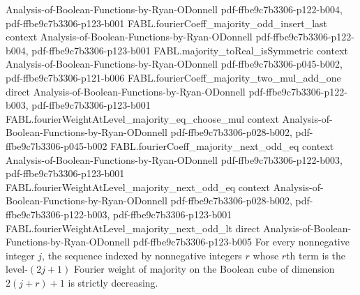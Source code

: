 \begin{theorem}
  {Analysis-of-Boolean-Functions-by-Ryan-ODonnell}
  {pdf-ffbe9c7b3306-p122-b004,
    pdf-ffbe9c7b3306-p123-b001}
\proofstep
  {FABL.fourierCoeff_majority_odd_insert_last}
  {context}
  {Analysis-of-Boolean-Functions-by-Ryan-ODonnell}
  {pdf-ffbe9c7b3306-p122-b004,
    pdf-ffbe9c7b3306-p123-b001}
\proofstep
  {FABL.majority_toReal_isSymmetric}
  {context}
  {Analysis-of-Boolean-Functions-by-Ryan-ODonnell}
  {pdf-ffbe9c7b3306-p045-b002,
    pdf-ffbe9c7b3306-p121-b006}
\proofstep
  {FABL.fourierCoeff_majority_two_mul_add_one}
  {direct}
  {Analysis-of-Boolean-Functions-by-Ryan-ODonnell}
  {pdf-ffbe9c7b3306-p122-b003,
    pdf-ffbe9c7b3306-p123-b001}
\proofstep
  {FABL.fourierWeightAtLevel_majority_eq_choose_mul}
  {context}
  {Analysis-of-Boolean-Functions-by-Ryan-ODonnell}
  {pdf-ffbe9c7b3306-p028-b002,
    pdf-ffbe9c7b3306-p045-b002}
\proofstep
  {FABL.fourierCoeff_majority_next_odd_eq}
  {context}
  {Analysis-of-Boolean-Functions-by-Ryan-ODonnell}
  {pdf-ffbe9c7b3306-p122-b003,
    pdf-ffbe9c7b3306-p123-b001}
\proofstep
  {FABL.fourierWeightAtLevel_majority_next_odd_eq}
  {context}
  {Analysis-of-Boolean-Functions-by-Ryan-ODonnell}
  {pdf-ffbe9c7b3306-p028-b002,
    pdf-ffbe9c7b3306-p122-b003,
    pdf-ffbe9c7b3306-p123-b001}
\proofstep
  {FABL.fourierWeightAtLevel_majority_next_odd_lt}
  {direct}
  {Analysis-of-Boolean-Functions-by-Ryan-ODonnell}
  {pdf-ffbe9c7b3306-p123-b005}
For every nonnegative integer $j$, the sequence indexed by nonnegative integers $r$
whose $r$th term is the level-$(2j+1)$ Fourier weight of majority on the Boolean cube of
dimension $2(j+r)+1$ is strictly decreasing.
\end{theorem}

